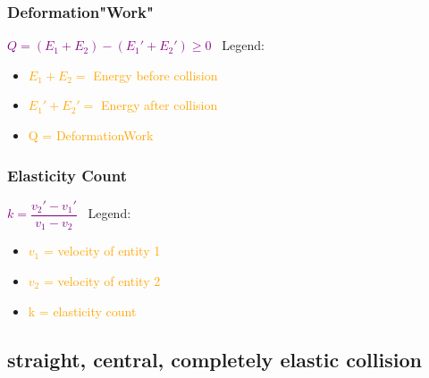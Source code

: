 \documentclass[main.tex,fontsize=8pt,paper=a4,paper=portrait,DIV=calc,]{scrartcl}
\begin{document}
\begin{multicols*}{2}
\subsubsection{Deformation"Work"}
\vspace{2mm}
\large \textcolor{purple}{\( Q = (E_1 + E_2) - (E_1' + E_2') \geq 0 \)}\newline
\normalsize \, \newline
Legend:\newline
\begin{itemize}
\item \textcolor{orange}{\( E_1 + E_2 =\) Energy before collision}
\item \textcolor{orange}{\( E_1' + E_2' =\) Energy after collision}
\item \textcolor{orange}{Q = DeformationWork}
\end{itemize} 

\subsubsection{Elasticity Count}
\vspace{2mm}
\large \textcolor{purple}{\( k = \dfrac{v_2' - v_1'}{v_1 - v_2} \)}\newline
\normalsize \, \newline
Legend:\newline
\begin{itemize}
\item \textcolor{orange}{\(v_1\) = velocity of entity 1}
\item \textcolor{orange}{\(v_2\) = velocity of entity 2}
\item \textcolor{orange}{k = elasticity count}
\end{itemize} 


\subsection{straight, central, completely elastic collision}


\end{multicols*}
\end{document}
